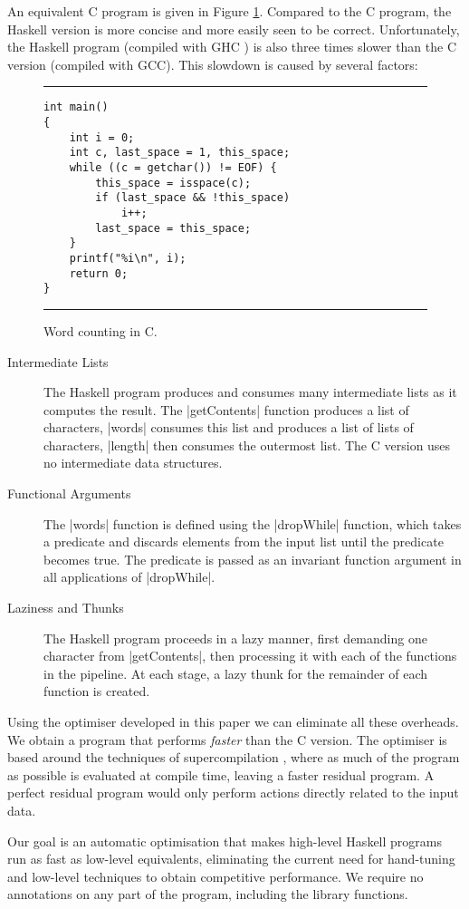 \documentclass{llncs}
\newenvironment{fig}
    {\begin{figure}[tbp]\hrule}
    {\end{figure}}
\newcommand{\figend}{\hrule}
\begin{document}
An equivalent C program is given in Figure \ref{fig:c_words}. Compared to the C program, the Haskell version is more concise and more easily seen to be correct. Unfortunately, the Haskell program (compiled with GHC \cite{ghc}) is also three times slower than the C version (compiled with GCC). This slowdown is caused by several factors:

\begin{fig}
\bigskip
\begin{verbatim}
int main()
{
	int i = 0;
	int c, last_space = 1, this_space;
	while ((c = getchar()) != EOF) {
		this_space = isspace(c);
		if (last_space && !this_space)
			i++;
		last_space = this_space;
	}
	printf("%i\n", i);
	return 0;
}
\end{verbatim}
\figend
\caption{Word counting in C.}
\label{fig:c_words}
\end{fig}

\begin{description}
\item[Intermediate Lists] The Haskell program produces and consumes many intermediate lists as it computes the result. The |getContents| function produces a list of characters, |words| consumes this list and produces a list of lists of characters, |length| then consumes the outermost list. The C version uses no intermediate data structures.
\item[Functional Arguments] The |words| function is defined using the |dropWhile| function, which takes a predicate and discards elements from the input list until the predicate becomes true. The predicate is passed as an invariant function argument in all applications of |dropWhile|.
\item[Laziness and Thunks] The Haskell program proceeds in a lazy manner, first demanding one character from |getContents|, then processing it with each of the functions in the pipeline. At each stage, a lazy thunk for the remainder of each function is created.
\end{description}

Using the optimiser developed in this paper we can eliminate all these overheads. We obtain a program that performs \textit{faster} than the C version. The optimiser is based around the techniques of supercompilation \cite{supercompilation}, where as much of the program as possible is evaluated at compile time, leaving a faster residual program. A perfect residual program would only perform actions directly related to the input data.

Our goal is an automatic optimisation that makes high-level Haskell programs run as fast as low-level equivalents, eliminating the current need for hand-tuning and low-level techniques to obtain competitive performance. We require no annotations on any part of the program, including the library functions.
\end{document}
